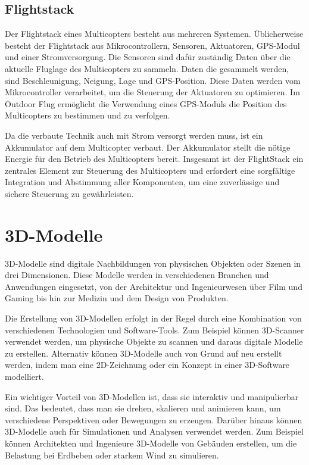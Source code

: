    
\subsection{Flightstack}

Der Flightstack eines Multicopters besteht aus mehreren Systemen. Üblicherweise besteht der Flightstack aus Mikrocontrollern, Sensoren, Aktuatoren, GPS-Modul und einer Stromversorgung. Die Sensoren sind dafür zuständig Daten über die aktuelle Fluglage des Multicopters zu sammeln. Daten die gesammelt werden, sind Beschleunigung, Neigung, Lage und GPS-Position. Diese Daten werden vom Mikrocontroller verarbeitet, um die Steuerung der Aktuatoren zu optimieren. Im Outdoor Flug ermöglicht die Verwendung eines GPS-Moduls die Position des Multicopters zu bestimmen und zu verfolgen.

Da die verbaute Technik auch mit Strom versorgt werden muss, ist ein Akkumulator auf dem Multicopter verbaut. Der Akkumulator stellt die nötige Energie für den Betrieb des Multicopters bereit. Insgesamt ist der FlightStack ein zentrales Element zur Steuerung des Multicopters und erfordert eine sorgfältige Integration und Abstimmung aller Komponenten, um eine zuverlässige und sichere Steuerung zu gewährleisten.

\cite[vgl.][Kapitel 2.4.2]{SWB-165930377X}

\section{3D-Modelle} \label{3d-modelle:section}
3D-Modelle sind digitale Nachbildungen von physischen Objekten oder Szenen in drei Dimensionen. Diese Modelle werden in verschiedenen Branchen und Anwendungen eingesetzt, von der Architektur und Ingenieurwesen über Film und Gaming bis hin zur Medizin und dem Design von Produkten.

Die Erstellung von 3D-Modellen erfolgt in der Regel durch eine Kombination von verschiedenen Technologien und Software-Tools. Zum Beispiel können 3D-Scanner verwendet werden, um physische Objekte zu scannen und daraus digitale Modelle zu erstellen. Alternativ können 3D-Modelle auch von Grund auf neu erstellt werden, indem man eine 2D-Zeichnung oder ein Konzept in einer 3D-Software modelliert.

Ein wichtiger Vorteil von 3D-Modellen ist, dass sie interaktiv und manipulierbar sind. Das bedeutet, dass man sie drehen, skalieren und animieren kann, um verschiedene Perspektiven oder Bewegungen zu erzeugen. Darüber hinaus können 3D-Modelle auch für Simulationen und Analysen verwendet werden. Zum Beispiel können Architekten und Ingenieure 3D-Modelle von Gebäuden erstellen, um die Belastung bei Erdbeben oder starkem Wind zu simulieren.

